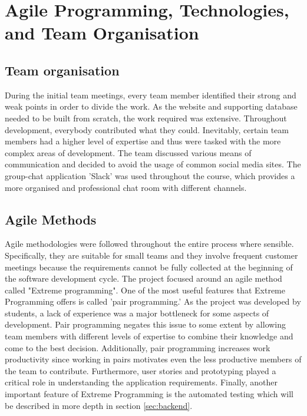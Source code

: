 \documentclass{l3proj}
\begin{document}
\section{Agile Programming, Technologies, and Team Organisation}

\subsection{Team organisation}
\label{sec:organisation}

During the initial team meetings, every team member identified their strong and weak points in order to divide the work. As the website and supporting database needed to be built from scratch, the work required was extensive. Throughout development, everybody contributed what they could. Inevitably, certain team members had a higher level of expertise and thus were tasked with the more complex areas of development. The team discussed various means of communication and decided to avoid the usage of common social media sites. The group-chat application 'Slack' was used throughout the course, which provides a more organised and professional chat room with different channels.

\subsection{Agile Methods}
\label{sec:agile}

Agile methodologies were followed throughout the entire process where sensible. Specifically, they are suitable for small teams and they involve frequent customer meetings because the requirements cannot be fully collected at the beginning of the software development cycle. The project focused around an agile method called "Extreme programming". One of the most useful features that Extreme Programming offers is called 'pair programming.' As the project was developed by students, a lack of experience was a major bottleneck for some aspects of development. Pair programming negates this issue to some extent by allowing team members with different levels of expertise to combine their knowledge and come to the best decision. Additionally, pair programming increases work productivity since working in pairs motivates even the less productive members of the team to contribute. Furthermore, user stories and prototyping played a critical role in understanding the application requirements. Finally, another important feature of Extreme Programming is the automated testing which will be described in more depth in section \ref{sec:backend}.
\end{document}
